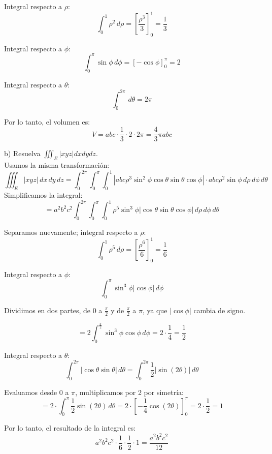 Integral respecto a $\rho$:
\[
  \int_{0}^{1} \rho^2 \, d\rho = \left[ \frac{\rho^3}{3} \right]_{0}^{1} = \frac{1}{3}
  \]


Integral respecto a $\phi$:
\[
  \int_{0}^{\pi} \sin \phi \, d\phi = \left[ -\cos \phi \right]_{0}^{\pi} = 2
  \]


Integral respecto a $\theta$:
\[
  \int_{0}^{2\pi} \, d\theta = 2\pi
  \]


Por lo tanto, el volumen es:
\[
V = abc \cdot \frac{1}{3} \cdot 2 \cdot 2\pi = \frac{4}{3} \pi abc
\]

b) Resuelva \( \iiint_{E}|x y z| d x d y d z \). \\
\aw Usamos la misma transformación:
\[
\iiint_{E} |x y z| \, dx \, dy \, dz = \int_{0}^{2\pi} \int_{0}^{\pi} \int_{0}^{1} |a b c \rho^3 \sin^2 \phi \cos \theta \sin \theta \cos \phi| \cdot abc \rho^2 \sin \phi \, d\rho \, d\phi \, d\theta
\]
Simplificamos la integral:
\[
= a^2 b^2 c^2 \int_{0}^{2\pi} \int_{0}^{\pi} \int_{0}^{1} \rho^5 \sin^3 \phi |\cos \theta \sin \theta \cos \phi| \, d\rho \, d\phi \, d\theta
\]

Separamos nuevamente; integral respecto a $\rho$:
\[
   \int_{0}^{1} \rho^5 \, d\rho = \left[ \frac{\rho^6}{6} \right]_{0}^{1} = \frac{1}{6}
   \]


Integral respecto a $\phi$:
\[
   \int_{0}^{\pi} \sin^3 \phi |\cos \phi| \, d\phi
   \]

Dividimos en dos partes, de \(0\) a \(\frac{\pi}{2}\) y de \(\frac{\pi}{2}\) a \(\pi\), ya que \(|\cos \phi|\) cambia de signo.

\[
   = 2 \int_{0}^{\frac{\pi}{2}} \sin^3 \phi \cos \phi \, d\phi = 2 \cdot \frac{1}{4} = \frac{1}{2}
   \]


Integral respecto a $\theta$:
\[
   \int_{0}^{2\pi} |\cos \theta \sin \theta| \, d\theta = \int_{0}^{2\pi} \frac{1}{2} |\sin(2\theta)| \, d\theta
   \]

Evaluamos desde 0 a $\pi$, multiplicamos por 2 por simetría:
\[
   = 2 \cdot \int_{0}^{\pi} \frac{1}{2} \sin(2\theta) \, d\theta = 2 \cdot \left[-\frac{1}{4} \cos(2\theta)\right]_{0}^{\pi} = 2 \cdot \frac{1}{2} = 1
   \]



Por lo tanto, el resultado de la integral es:
\[
a^2 b^2 c^2 \cdot \frac{1}{6} \cdot \frac{1}{2} \cdot 1 = \frac{a^2 b^2 c^2}{12}
\]